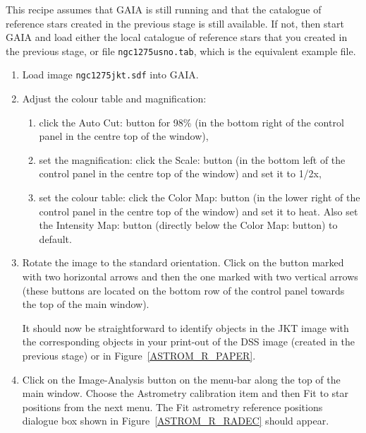\documentclass[twoside,11pt]{starlink}
\begin{document}
This recipe assumes that GAIA is still running and that the catalogue of
reference stars created in the previous stage is still available.  If not,
then start GAIA and load either the local catalogue of reference stars
that you created in the previous stage, or file  \texttt{ngc1275usno.tab},
which is the equivalent example file.

\begin{enumerate}

  \item Load image \texttt{ngc1275jkt.sdf} into GAIA.

  \item Adjust the colour table and magnification:

  \begin{enumerate}

    \item click the \textsf{Auto Cut:} button for \textsf{98\%} (in the bottom
     right of the control panel in the centre top of the window),

    \item set the magnification: click the \textsf{Scale:} button (in the
     bottom left of the control panel in the centre top of the window) and
     set it to \textsf{1/2x},

    \item set the colour table: click the \textsf{Color Map:} button (in the
     lower right of the control panel in the centre top of the window) and
     set it to \textsf{heat}.  Also set the \textsf{Intensity Map:} button
     (directly below the \textsf{Color Map:} button) to \textsf{default}.

  \end{enumerate}

  \item Rotate the image to the standard orientation.  Click on the button
   marked with two horizontal arrows and then the one marked with two
   vertical arrows (these buttons are located on the bottom row of the
   control panel towards the top of the main window).

   It should now be straightforward to identify objects in the JKT image
   with the corresponding objects in your print-out of the DSS image
   (created in the previous stage) or in Figure~\ref{ASTROM_R_PAPER}.

  \item Click on the \textsf{Image-Analysis} button on the menu-bar along the
   top of the main window.  Choose the \textsf{Astrometry calibration} item
   and then \textsf{Fit to star positions} from the next menu.  The \textsf{Fit
   astrometry reference positions} dialogue box shown in
   Figure~\ref{ASTROM_R_RADEC} should appear.


\end{enumerate}
\end{document}
